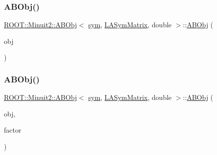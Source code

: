 \mbox{\label{classROOT_1_1Minuit2_1_1ABObj_3_01sym_00_01LASymMatrix_00_01double_01_4_a22738586c6027ada2234556dbab7d406}} 
\subsubsection{\texorpdfstring{ABObj()}{ABObj()}\hspace{0.1cm}{\footnotesize\ttfamily [5/12]}}
{\footnotesize\ttfamily \mbox{\hyperlink{classROOT_1_1Minuit2_1_1ABObj}{R\+O\+O\+T\+::\+Minuit2\+::\+A\+B\+Obj}}$<$ \mbox{\hyperlink{classROOT_1_1Minuit2_1_1sym}{sym}}, \mbox{\hyperlink{classROOT_1_1Minuit2_1_1LASymMatrix}{L\+A\+Sym\+Matrix}}, double $>$\+::\mbox{\hyperlink{classROOT_1_1Minuit2_1_1ABObj}{A\+B\+Obj}} (\begin{DoxyParamCaption}\item[{const \mbox{\hyperlink{classROOT_1_1Minuit2_1_1LASymMatrix}{L\+A\+Sym\+Matrix}} \&}]{obj }\end{DoxyParamCaption})\hspace{0.3cm}{\ttfamily [inline]}}

\mbox{\label{classROOT_1_1Minuit2_1_1ABObj_3_01sym_00_01LASymMatrix_00_01double_01_4_a85558830240c4e85aadec196587fe8e5}} 
\subsubsection{\texorpdfstring{ABObj()}{ABObj()}\hspace{0.1cm}{\footnotesize\ttfamily [6/12]}}
{\footnotesize\ttfamily \mbox{\hyperlink{classROOT_1_1Minuit2_1_1ABObj}{R\+O\+O\+T\+::\+Minuit2\+::\+A\+B\+Obj}}$<$ \mbox{\hyperlink{classROOT_1_1Minuit2_1_1sym}{sym}}, \mbox{\hyperlink{classROOT_1_1Minuit2_1_1LASymMatrix}{L\+A\+Sym\+Matrix}}, double $>$\+::\mbox{\hyperlink{classROOT_1_1Minuit2_1_1ABObj}{A\+B\+Obj}} (\begin{DoxyParamCaption}\item[{const \mbox{\hyperlink{classROOT_1_1Minuit2_1_1LASymMatrix}{L\+A\+Sym\+Matrix}} \&}]{obj,  }\item[{double}]{factor }\end{DoxyParamCaption})\hspace{0.3cm}{\ttfamily [inline]}}

